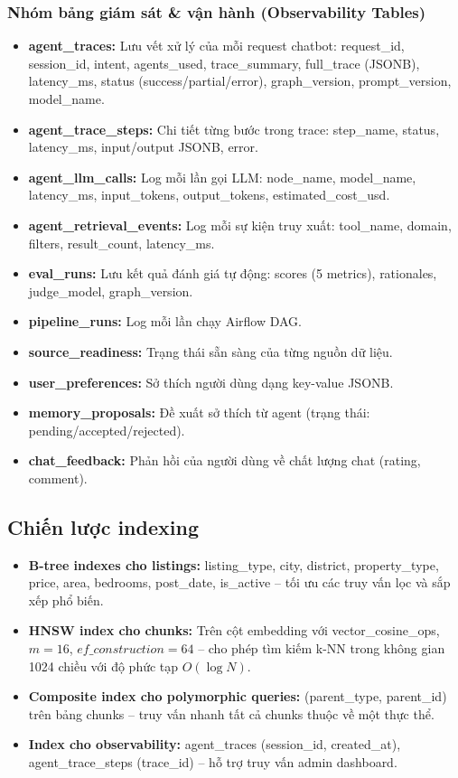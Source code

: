 \subsubsection{Nhóm bảng giám sát \& vận hành (Observability Tables)}

\begin{itemize}
    \item \textbf{agent\_traces:} Lưu vết xử lý của mỗi request chatbot: request\_id, session\_id, intent, agents\_used, trace\_summary, full\_trace (JSONB), latency\_ms, status (success/partial/error), graph\_version, prompt\_version, model\_name.
    \item \textbf{agent\_trace\_steps:} Chi tiết từng bước trong trace: step\_name, status, latency\_ms, input/output JSONB, error.
    \item \textbf{agent\_llm\_calls:} Log mỗi lần gọi LLM: node\_name, model\_name, latency\_ms, input\_tokens, output\_tokens, estimated\_cost\_usd.
    \item \textbf{agent\_retrieval\_events:} Log mỗi sự kiện truy xuất: tool\_name, domain, filters, result\_count, latency\_ms.
    \item \textbf{eval\_runs:} Lưu kết quả đánh giá tự động: scores (5 metrics), rationales, judge\_model, graph\_version.
    \item \textbf{pipeline\_runs:} Log mỗi lần chạy Airflow DAG.
    \item \textbf{source\_readiness:} Trạng thái sẵn sàng của từng nguồn dữ liệu.
    \item \textbf{user\_preferences:} Sở thích người dùng dạng key-value JSONB.
    \item \textbf{memory\_proposals:} Đề xuất sở thích từ agent (trạng thái: pending/accepted/rejected).
    \item \textbf{chat\_feedback:} Phản hồi của người dùng về chất lượng chat (rating, comment).
\end{itemize}

\subsection{Chiến lược indexing}

\begin{itemize}
    \item \textbf{B-tree indexes cho listings:} listing\_type, city, district, property\_type, price, area, bedrooms, post\_date, is\_active -- tối ưu các truy vấn lọc và sắp xếp phổ biến.
    \item \textbf{HNSW index cho chunks:} Trên cột embedding với vector\_cosine\_ops, $m=16$, $ef\_construction=64$ -- cho phép tìm kiếm k-NN trong không gian 1024 chiều với độ phức tạp $O(\log N)$.
    \item \textbf{Composite index cho polymorphic queries:} (parent\_type, parent\_id) trên bảng chunks -- truy vấn nhanh tất cả chunks thuộc về một thực thể.
    \item \textbf{Index cho observability:} agent\_traces (session\_id, created\_at), agent\_trace\_steps (trace\_id) -- hỗ trợ truy vấn admin dashboard.
\end{itemize}


